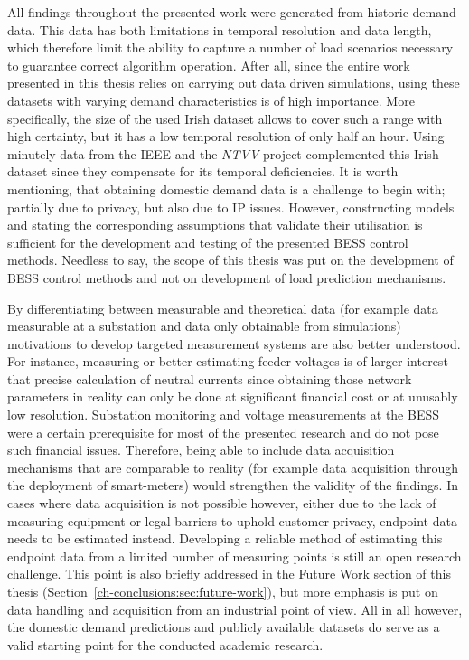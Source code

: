 All findings throughout the presented work were generated from historic demand data.
This data has both limitations in temporal resolution and data length, which therefore limit the ability to capture a number of load scenarios necessary to guarantee correct algorithm operation.
After all, since the entire work presented in this thesis relies on carrying out data driven simulations, using these datasets with varying demand characteristics is of high importance.
More specifically, the size of the used Irish dataset allows to cover such a range with high certainty, but it has a low temporal resolution of only half an hour.
Using minutely data from the IEEE and the \textit{NTVV} project complemented this Irish dataset since they compensate for its temporal deficiencies.
It is worth mentioning, that obtaining domestic demand data is a challenge to begin with; partially due to privacy, but also due to IP issues.
However, constructing models and stating the corresponding assumptions that validate their utilisation is sufficient for the development and testing of the presented BESS control methods.
Needless to say, the scope of this thesis was put on the development of BESS control methods and not on development of load prediction mechanisms.

By differentiating between measurable and theoretical data (for example data measurable at a substation and data only obtainable from simulations) motivations to develop targeted measurement systems are also better understood.
For instance, measuring or better estimating feeder voltages is of larger interest that precise calculation of neutral currents since obtaining those network parameters in reality can only be done at significant financial cost or at unusably low resolution.
Substation monitoring and voltage measurements at the BESS were a certain prerequisite for most of the presented research and do not pose such financial issues.
Therefore, being able to include data acquisition mechanisms that are comparable to reality (for example data acquisition through the deployment of smart-meters) would strengthen the validity of the findings.
In cases where data acquisition is not possible however, either due to the lack of measuring equipment or legal barriers to uphold customer privacy, endpoint data needs to be estimated instead.
Developing a reliable method of estimating this endpoint data from a limited number of measuring points is still an open research challenge.
This point is also briefly addressed in the Future Work section of this thesis (Section~\ref{ch-conclusions:sec:future-work}), but more emphasis is put on data handling and acquisition from an industrial point of view.
All in all however, the domestic demand predictions and publicly available datasets do serve as a valid starting point for the conducted academic research.

